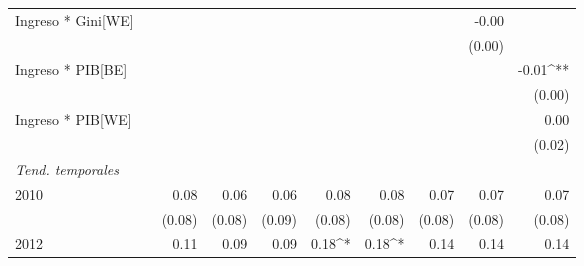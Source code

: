 \documentclass[12pt,letterpaper]{article}
\begin{document}
\begin{landscape}
\begin{table}
\begin{center}
\begin{tabular}{l D{.}{.}{5} D{.}{.}{5} D{.}{.}{5} D{.}{.}{5} D{.}{.}{5} D{.}{.}{5} D{.}{.}{5} D{.}{.}{5} D{.}{.}{5} }
				Ingreso * Gini[WE]            &                        &                        &                        &                        &                        &                        &                        & -0.00                   &                        \\
				&                        &                        &                        &                        &                        &                        &                        & (0.00)                 &                        \\
				Ingreso * PIB[BE]             &                        &                        &                        &                        &                        &                        &                        &                        & -0.01^{**}             \\
				&                        &                        &                        &                        &                        &                        &                        &                        & (0.00)                 \\
				Ingreso * PIB[WE]             &                        &                        &                        &                        &                        &                        &                        &                        & 0.00                   \\
				&                        &                        &                        &                        &                        &                        &                        &                        & (0.02)                 \\
				\textit{Tend. temporales}    &                        &                        &                        &                        &                        &                        &                        &                        &                        \\
				2010                          &                        & 0.08                   & 0.06                   & 0.06                   & 0.08                   & 0.08                   & 0.07                   & 0.07                   & 0.07                   \\
				&                        & (0.08)                 & (0.08)                 & (0.09)                 & (0.08)                 & (0.08)                 & (0.08)                 & (0.08)                 & (0.08)                 \\
				2012                          &                        & 0.11                   & 0.09                   & 0.09                   & 0.18^{*}               & 0.18^{*}               & 0.14                   & 0.14                   & 0.14                   \\

\end{tabular}
\end{center}
\end{table}
\end{landscape}
\end{document}

